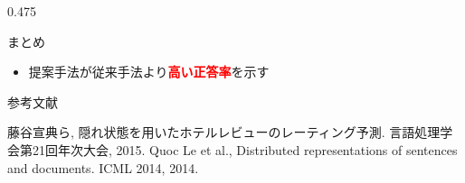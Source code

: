 \documentclass[unicode,10pt]{beamer}
\newcommand{\fire}[1]{\textcolor{red}{\textbf{#1}}}
\newcommand{\columnsize}{0.475\textwidth}
\begin{document}
\begin{frame}
\begin{columns}[onlytextwidth,t]
\begin{column}{\columnsize}
  \begin{block}{まとめ}
    \begin{itemize}
      \item 提案手法が従来手法より\fire{高い正答率}を示す
    \end{itemize}
  \end{block}

  参考文献
  
  \begin{thebibliography}{9}
    藤谷宣典ら,
    隠れ状態を用いたホテルレビューのレーティング予測.
    言語処理学会第21回年次大会, 2015.
    Quoc Le et al.,
    Distributed representations of sentences and documents.
    ICML 2014, 2014.
  \end{thebibliography}
\end{column}

\end{columns}
\end{frame}
\end{document}
